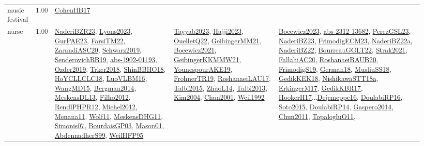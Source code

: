 {\begin{longtable}{p{3cm}r>{\raggedright\arraybackslash}p{6cm}>{\raggedright\arraybackslash}p{6cm}>{\raggedright\arraybackslash}p{8cm}}
\index{music festival}\index{ApplicationAreas!music festival}music festival &  1.00 & \hyperref[detail:CohenHB17]{CohenHB17} &  & \\
\index{nurse}\index{ApplicationAreas!nurse}nurse &  1.00 & \hyperref[detail:NaderiBZR23]{NaderiBZR23}, \hyperref[detail:Lyons2023]{Lyons2023}, \hyperref[detail:GurPAE23]{GurPAE23}, \hyperref[detail:FarsiTM22]{FarsiTM22}, \hyperref[detail:ZarandiASC20]{ZarandiASC20}, \hyperref[detail:Schwarz2019]{Schwarz2019}, \hyperref[detail:SenderovichBB19]{SenderovichBB19}, \hyperref[detail:abs-1902-01193]{abs-1902-01193}, \hyperref[detail:Ozder2019]{Ozder2019}, \hyperref[detail:Trker2018]{Trker2018}, \hyperref[detail:ShinBBHO18]{ShinBBHO18}, \hyperref[detail:HoYCLLCLC18]{HoYCLLCLC18}, \hyperref[detail:LuoVLBM16]{LuoVLBM16}, \hyperref[detail:WangMD15]{WangMD15}, \hyperref[detail:Bergman2014]{Bergman2014}, \hyperref[detail:MeskensDL13]{MeskensDL13}, \hyperref[detail:Filho2012]{Filho2012}, \hyperref[detail:RendlPHPR12]{RendlPHPR12}, \hyperref[detail:Michel2012]{Michel2012}, \hyperref[detail:Menana11]{Menana11}, \hyperref[detail:Wolf11]{Wolf11}, \hyperref[detail:MeskensDHG11]{MeskensDHG11}, \hyperref[detail:Simonis07]{Simonis07}, \hyperref[detail:BourdaisGP03]{BourdaisGP03}, \hyperref[detail:Mason01]{Mason01}, \hyperref[detail:AbdennadherS99]{AbdennadherS99}, \hyperref[detail:WeilHFP95]{WeilHFP95} & \hyperref[detail:Tayyab2023]{Tayyab2023}, \hyperref[detail:Hajji2023]{Hajji2023}, \hyperref[detail:OuelletQ22]{OuelletQ22}, \hyperref[detail:GeibingerMM21]{GeibingerMM21}, \hyperref[detail:Bocewicz2021]{Bocewicz2021}, \hyperref[detail:GeibingerKKMMW21]{GeibingerKKMMW21}, \hyperref[detail:YounespourAKE19]{YounespourAKE19}, \hyperref[detail:FrohnerTR19]{FrohnerTR19}, \hyperref[detail:RoshanaeiLAU17]{RoshanaeiLAU17}, \hyperref[detail:Talbi2015]{Talbi2015}, \hyperref[detail:ZhaoL14]{ZhaoL14}, \hyperref[detail:Talbi2013]{Talbi2013}, \hyperref[detail:Kim2004]{Kim2004}, \hyperref[detail:Chan2001]{Chan2001}, \hyperref[detail:Weil1992]{Weil1992} & \hyperref[detail:Bocewicz2023]{Bocewicz2023}, \hyperref[detail:abs-2312-13682]{abs-2312-13682}, \hyperref[detail:PerezGSL23]{PerezGSL23}, \hyperref[detail:NaderiBZ23]{NaderiBZ23}, \hyperref[detail:FrimodigECM23]{FrimodigECM23}, \hyperref[detail:NaderiBZ22a]{NaderiBZ22a}, \hyperref[detail:NaderiBZ22]{NaderiBZ22}, \hyperref[detail:BourreauGGLT22]{BourreauGGLT22}, \hyperref[detail:Strak2021]{Strak2021}, \hyperref[detail:FallahiAC20]{FallahiAC20}, \hyperref[detail:RoshanaeiBAUB20]{RoshanaeiBAUB20}, \hyperref[detail:FrimodigS19]{FrimodigS19}, \hyperref[detail:German18]{German18}, \hyperref[detail:MusliuSS18]{MusliuSS18}, \hyperref[detail:GedikKEK18]{GedikKEK18}, \hyperref[detail:NishikawaSTT18a]{NishikawaSTT18a}, \hyperref[detail:ErkingerM17]{ErkingerM17}, \hyperref[detail:GedikKBR17]{GedikKBR17}, \hyperref[detail:HookerH17]{HookerH17}...\hyperref[detail:Dejemeppe16]{Dejemeppe16}, \hyperref[detail:DoulabiRP16]{DoulabiRP16}, \hyperref[detail:Soto2015]{Soto2015}, \hyperref[detail:DoulabiRP14]{DoulabiRP14}, \hyperref[detail:Gaspero2014]{Gaspero2014}, \hyperref[detail:Chun2011]{Chun2011}, \hyperref[detail:TopalogluO11]{TopalogluO11}, 
\end{longtable}}
